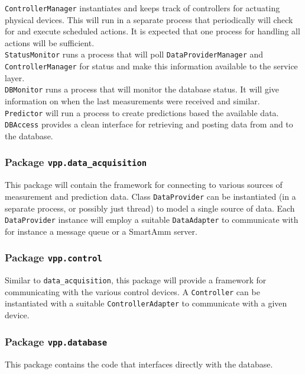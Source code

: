 \texttt{ControllerManager} instantiates and keeps track of controllers for actuating physical devices. This will run in a separate process that periodically will check for and execute scheduled actions. It is expected that one process for handling all actions will be sufficient. \\

\texttt{StatusMonitor} runs a process that will poll \texttt{DataProviderManager} and \texttt{ControllerManager} for status and make this information available to the service layer.\\

\texttt{DBMonitor} runs a process that will monitor the database status. It will give information on when the last measurements were received and similar.\\

\texttt{Predictor} will run a process to create predictions based the available data.\\

\texttt{DBAccess} provides a clean interface for retrieving and posting data from and to the database. 

\subsubsection{Package \texttt{vpp.data\_acquisition}}
This package will contain the framework for connecting to various sources of measurement and prediction data. Class \texttt{DataProvider} can be instantiated (in a separate process, or possibly just thread) to model a single source of data. Each \texttt{DataProvider} instance will employ a suitable \texttt{DataAdapter} to communicate with for instance a message queue or a SmartAmm server.

\subsubsection{Package \texttt{vpp.control}}
Similar to \texttt{data\_acquisition}, this package will provide a framework for communicating with the various control devices. A \texttt{Controller} can be instantiated with a suitable \texttt{ControllerAdapter} to communicate with a given device. 


\subsubsection{Package \texttt{vpp.database}}
This package contains the code that interfaces directly with the database. 

